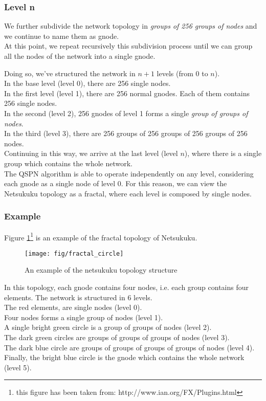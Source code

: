 \documentclass[a4paper]{article}
\newcommand{\href}[2]{ #1 }
\begin{document}
\subsubsection{Level n}
We further subdivide the network topology in \emph{groups of 256 groups of nodes}
and we continue to name them as gnode.\\
At this point, we repeat recursively this subdivision process until
we can group all the nodes of the network into a single gnode.

Doing so, we've structured the network in $n+1$ levels (from $0$ to $n$).\\
In the base level (level 0), there are 256 single nodes.\\
In the first level (level 1), there are 256 normal gnodes. Each of them
contains 256 single nodes.\\
In the second (level 2), 256 gnodes of level 1 forms a single \emph{group of
groups of nodes}.\\
In the third (level 3), there are 256 groups of 256 groups of 256 groups of
256 nodes.\\
Continuing in this way, we arrive at the last level (level $n$), where there
is a single group which contains the whole network.\\

The QSPN algorithm is able to operate independently on any level,
considering each gnode as a single node of level 0.
For this reason, we can view the Netsukuku topology as a fractal, where each
level is composed by single nodes.

\subsubsection*{Example}

Figure \ref{fig:fract_circle}\footnote{this figure has been taken from:
\href{http://www.ian.org/FX/Plugins.html}{http://www.ian.org/FX/Plugins.html}}
is an example of the fractal topology of Netsukuku.

\begin{figure}[h]
	\begin{center}
		\texttt{[image: fig/fractal\_circle]}
	\end{center}
	\caption{An example of the netsukuku topology structure}
	\label{fig:fract_circle}
\end{figure}

In this topology, each gnode contains four nodes, i.e. each group contains
four elements. The network is structured in 6 levels.\\
The red elements, are single nodes (level 0).\\
Four nodes forms a single group of nodes (level 1).\\
A single bright green circle is a 
				  group of groups of nodes (level 2).\\
The dark green circles are        groups of groups of groups of nodes (level 3).\\
The dark blue circle are          groups of groups of groups of groups of
nodes (level 4). \\
Finally, the bright blue circle is the gnode which contains the whole network
(level 5).
\end{document}
